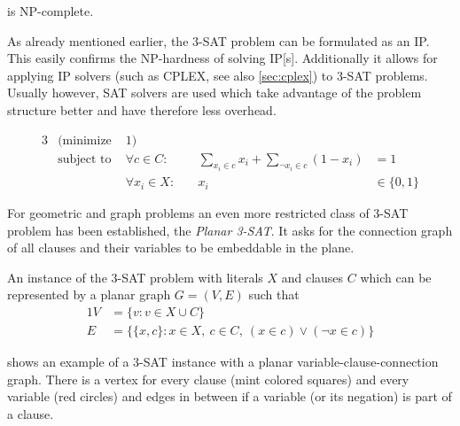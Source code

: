 \begin{theorem}
   is NP-complete.~\cite[Satisfiability with at most %
  3 Literals per Clause]{karp_np_complete}
\end{theorem}

As already mentioned earlier, the 3-SAT problem can be formulated as
an \gls{IP}. This easily confirms the NP-hardness of solving
\gls{IP}[s]. Additionally it allows for applying \gls{IP} solvers 
(such as CPLEX, see also \cref{sec:cplex}) to 3-SAT problems. Usually
however, SAT solvers are used which take advantage of the problem
structure better and have therefore less overhead.

\begin{problem}
  \begin{alignat*}{3}
    &(\text{minimize } & 1) \\
    &\text{subject to } & \forall c \in C : &~
    & \sum\limits_{x_i \in c} x_i + \sum\limits_{\lnot x_i \in c} (1 - x_i) &= 1 \\
    && \forall x_i \in X : &~& x_i &\in \{0,1\}
  \end{alignat*}
\end{problem}

For geometric and graph problems an even more restricted class of
3-SAT problem has been established, the \emph{Planar 3-SAT}. It asks
for the connection graph of all clauses and their variables to be
embeddable in the plane.

\begin{problem}
  \label{prob:planar_3SAT}
  An instance of the 3-SAT problem with literals \(X\) and
  clauses \(C\) which can be represented by a planar graph
  \(G = (V,E)\) such that
  \begin{alignat*}{1}
    V &= \{v : v \in X \cup C\} \\
    E &= \{ \{x, c\} :
      x \in X,~
      c \in C,~
      (x \in c) \lor (\lnot x \in c)
    \}
  \end{alignat*}
\end{problem}

 shows an example of a 3-SAT instance
with a planar variable-clause-connection graph. There is a vertex for
every clause (mint colored squares) and every variable (red circles)
and edges in between if a variable (or its negation) is part of a
clause.

